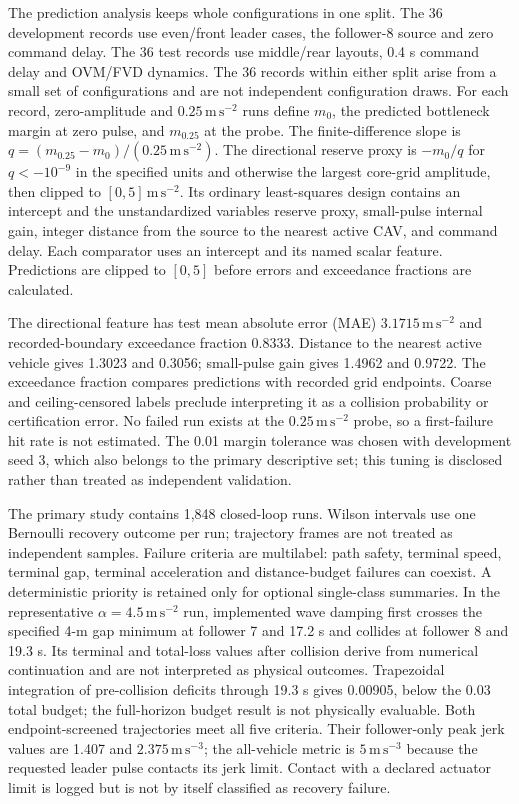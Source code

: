 \documentclass[11pt]{article}
\begin{document}
The prediction analysis keeps whole configurations in one split. The 36 development records use even/front leader cases, the follower-8 source and zero command delay. The 36 test records use middle/rear layouts, 0.4 s command delay and OVM/FVD dynamics. The 36 records within either split arise from a small set of configurations and are not independent configuration draws. For each record, zero-amplitude and $0.25\,\mathrm{m\,s^{-2}}$ runs define $m_0$, the predicted bottleneck margin at zero pulse, and $m_{0.25}$ at the probe. The finite-difference slope is $q=(m_{0.25}-m_0)/(0.25\,\mathrm{m\,s^{-2}})$. The directional reserve proxy is $-m_0/q$ for $q<-10^{-9}$ in the specified units and otherwise the largest core-grid amplitude, then clipped to $[0,5]\,\mathrm{m\,s^{-2}}$. Its ordinary least-squares design contains an intercept and the unstandardized variables reserve proxy, small-pulse internal gain, integer distance from the source to the nearest active CAV, and command delay. Each comparator uses an intercept and its named scalar feature. Predictions are clipped to $[0,5]$ before errors and exceedance fractions are calculated.

The directional feature has test mean absolute error (MAE) $3.1715\,\mathrm{m\,s^{-2}}$ and recorded-boundary exceedance fraction 0.8333. Distance to the nearest active vehicle gives 1.3023 and 0.3056; small-pulse gain gives 1.4962 and 0.9722. The exceedance fraction compares predictions with recorded grid endpoints. Coarse and ceiling-censored labels preclude interpreting it as a collision probability or certification error. No failed run exists at the $0.25\,\mathrm{m\,s^{-2}}$ probe, so a first-failure hit rate is not estimated. The 0.01 margin tolerance was chosen with development seed 3, which also belongs to the primary descriptive set; this tuning is disclosed rather than treated as independent validation.

The primary study contains 1,848 closed-loop runs. Wilson intervals use one Bernoulli recovery outcome per run; trajectory frames are not treated as independent samples. Failure criteria are multilabel: path safety, terminal speed, terminal gap, terminal acceleration and distance-budget failures can coexist. A deterministic priority is retained only for optional single-class summaries. In the representative $\alpha=4.5\,\mathrm{m\,s^{-2}}$ run, implemented wave damping first crosses the specified 4-m gap minimum at follower 7 and 17.2 s and collides at follower 8 and 19.3 s. Its terminal and total-loss values after collision derive from numerical continuation and are not interpreted as physical outcomes. Trapezoidal integration of pre-collision deficits through 19.3 s gives 0.00905, below the 0.03 total budget; the full-horizon budget result is not physically evaluable. Both endpoint-screened trajectories meet all five criteria. Their follower-only peak jerk values are 1.407 and $2.375\,\mathrm{m\,s^{-3}}$; the all-vehicle metric is $5\,\mathrm{m\,s^{-3}}$ because the requested leader pulse contacts its jerk limit. Contact with a declared actuator limit is logged but is not by itself classified as recovery failure.
\end{document}
